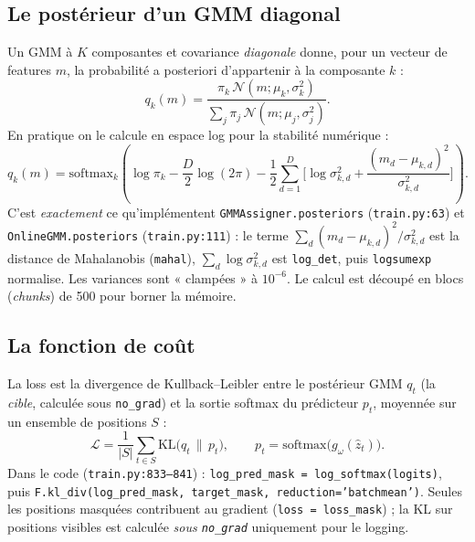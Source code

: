 \documentclass[11pt,a4paper]{article}
\newcommand{\code}[1]{\texttt{#1}}
\newcommand{\file}[1]{\texttt{#1}}
\begin{document}
\subsection{Le postérieur d'un GMM diagonal}

Un GMM à $K$ composantes et covariance \emph{diagonale} donne, pour un
vecteur de features $m$, la probabilité a posteriori d'appartenir à la
composante $k$ :
\begin{equation}
q_k(m) = \frac{\pi_k\,\mathcal{N}(m;\mu_k,\sigma_k^2)}
              {\sum_j \pi_j\,\mathcal{N}(m;\mu_j,\sigma_j^2)}.
\end{equation}
En pratique on le calcule en espace log pour la stabilité numérique :
\begin{equation}
q_k(m) = \mathrm{softmax}_k\!\left(
  \log\pi_k - \frac{D}{2}\log(2\pi)
  - \frac{1}{2}\sum_{d=1}^{D}\Big[
      \log\sigma_{k,d}^2 + \frac{(m_d-\mu_{k,d})^2}{\sigma_{k,d}^2}
    \Big]\right).
\label{eq:gmm_post}
\end{equation}
C'est \emph{exactement} ce qu'implémentent \code{GMMAssigner.posteriors}
(\file{train.py:63}) et \code{OnlineGMM.posteriors} (\file{train.py:111}) :
le terme $\sum_d (m_d-\mu_{k,d})^2/\sigma_{k,d}^2$ est la distance de
Mahalanobis (\code{mahal}), $\sum_d\log\sigma_{k,d}^2$ est \code{log\_det},
puis \code{logsumexp} normalise. Les variances sont « clampées » à
$10^{-6}$. Le calcul est découpé en blocs (\emph{chunks}) de 500 pour
borner la mémoire.

\subsection{La fonction de coût}

La loss est la divergence de Kullback--Leibler entre le postérieur GMM
$q_t$ (la \emph{cible}, calculée sous \code{no\_grad}) et la sortie
softmax du prédicteur $p_t$, moyennée sur un ensemble de positions $S$ :
\begin{equation}
\mathcal{L} = \frac{1}{|S|}\sum_{t\in S}\mathrm{KL}\big(q_t \,\|\, p_t\big),
\qquad p_t = \mathrm{softmax}\big(g_\omega(\hat z_t)\big).
\label{eq:loss}
\end{equation}
Dans le code (\file{train.py:833--841}) : \code{log\_pred\_mask =
log\_softmax(logits)}, puis \code{F.kl\_div(log\_pred\_mask, target\_mask,
reduction='batchmean')}. Seules les positions masquées contribuent au
gradient (\code{loss = loss\_mask}) ; la KL sur positions visibles est
calculée \emph{sous \code{no\_grad}} uniquement pour le logging.
\end{document}
